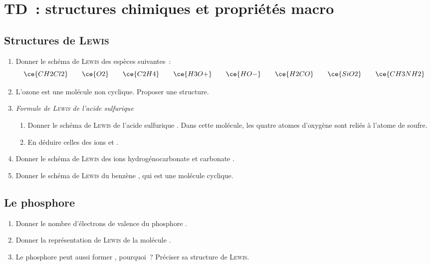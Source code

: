 \documentclass[a4paper, 12pt, final, garamond]{book}
\renewcommand\thechapter{1 et 2}
\begin{document}

\chapter{TD~: structures chimiques et propri\'et\'es macro}


\section{Structures de \textsc{Lewis}}
\begin{enumerate}
    \item Donner le schéma de \textsc{Lewis} des espèces suivantes~:
        \[
            \ce{CH2Cl2}
            \qquad
            \ce{O2}
            \qquad
            \ce{C2H4}
            \qquad
            \ce{H3O+}
            \qquad
            \ce{HO-}
            \qquad
            \ce{H2CO}
            \qquad
            \ce{SiO2}
            \qquad
            \ce{CH3NH2}
        \]
    \item L'ozone  est une molécule non cyclique. Proposer une structure.
    \item \textit{Formule de \textsc{Lewis} de l'acide sulfurique}
    \begin{enumerate}[]
        \item Donner le schéma de \textsc{Lewis} de l'acide sulfurique
            . Dans cette molécule, les quatre atomes d'oxygène sont
            reliés à l'atome de soufre.
        \item En déduire celles des ions  et .
    \end{enumerate}
    \item Donner le schéma de \textsc{Lewis} des ions hydrogénocarbonate
         et carbonate .
    \item Donner le schéma de \textsc{Lewis} du benzène , qui est une
        molécule cyclique.
\end{enumerate}

\section{Le phosphore}
\begin{enumerate}
    \item Donner le nombre d'électrons de valence du phosphore .
    \item Donner la représentation de \textsc{Lewis} de la molécule .
    \item Le phosphore peut aussi former , pourquoi~? Préciser sa
        structure de \textsc{Lewis}.
\end{enumerate}
\end{document}
